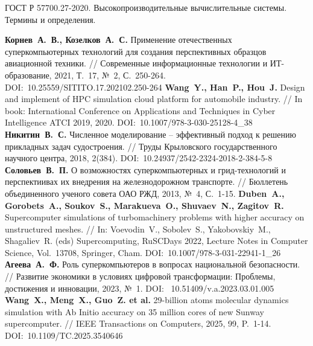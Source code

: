 \newpage

\renewcommand{\baselinestretch}{1.0}
\begin{thebibliography}{99}







ГОСТ Р 57700.27-2020. Высокопроизводительные вычислительные системы. Термины и определения.



%
\textbf{Корнев~А.~В., Козелков~А.~С.} Применение отечественных суперкомпьютерных технологий для создания перспективных образцов авиационной техники. // Современные информационные технологии и ИТ-образование, 2021, Т.~17, №~2, С.~250-264. DOI:~10.25559/SITITO.17.202102.250-264
%
\textbf{Wang~Y., Han~P., Hou~J.} Design and implement of HPC simulation cloud platform for automobile industry. // In book: International Conference on Applications and Techniques in Cyber Intelligence ATCI 2019, 2020. DOI:~10.1007/978-3-030-25128-4\_38
%
\textbf{Никитин~В.~С.} Численное моделирование -- эффективный подход к решению прикладных задач судостроения. // Труды Крыловского государственного научного центра, 2018, 2(384). DOI:~10.24937/2542-2324-2018-2-384-5-8
%
\textbf{Соловьев~В.~П.} О возможностях суперкомпьютерных и грид-технологий и перспектиивах их внедрения на железнодорожном транспорте. // Бюллетень объединенного ученого совета ОАО РЖД, 2013, №~4, С.~1-15.
%
\textbf{Duben~A., Gorobets~A., Soukov~S., Marakueva~O., Shuvaev~N., Zagitov~R.} Supercomputer simulations of turbomachinery problems with higher accuracy on unstructured meshes. // In: Voevodin~V., Sobolev~S., Yakobovskiy~M., Shagaliev~R. (eds) Supercomputing, RuSCDays 2022, Lecture Notes in Computer Science, Vol.~13708, Springer, Cham. DOI:~10.1007/978-3-031-22941-1\_26 
%
\textbf{Агеева~А.~Ф.} Роль суперкомпьютеров в вопросах национальной безопасности. // Развитие экономики в условиях цифровой трансформации: Проблемы, достижения и инновации, 2023, №~1. DOI:~ 10.51409/v.a.2023.03.01.005
%
\textbf{Wang~X., Meng~X., Guo~Z. et al.} 29-billion atoms molecular dynamics simulation with Ab Initio accuracy on 35 million cores of new Sunway supercomputer. // IEEE Transactions on Computers, 2025, 99, P.~1-14. DOI:~10.1109/TC.2025.3540646
%




\end{thebibliography}
